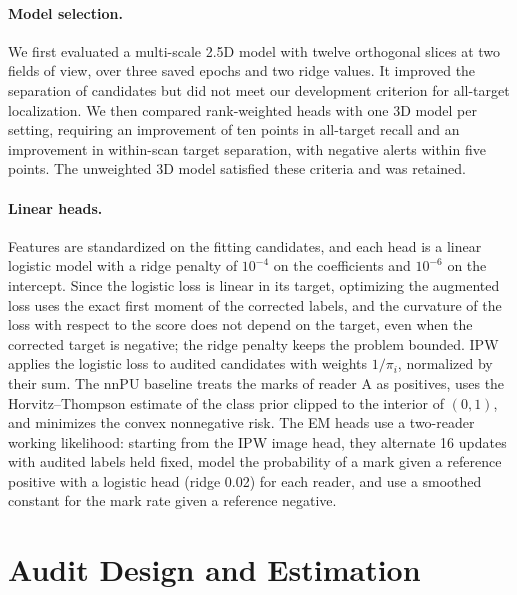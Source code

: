 \paragraph{Model selection.}
We first evaluated a multi-scale 2.5D model with twelve orthogonal slices at two fields of view, over three saved epochs and two ridge values. It improved the separation of candidates but did not meet our development criterion for all-target localization. We then compared rank-weighted heads with one 3D model per setting, requiring an improvement of ten points in all-target recall and an improvement in within-scan target separation, with negative alerts within five points. The unweighted 3D model satisfied these criteria and was retained.

\paragraph{Linear heads.}
Features are standardized on the fitting candidates, and each head is a linear logistic model with a ridge penalty of $10^{-4}$ on the coefficients and $10^{-6}$ on the intercept. Since the logistic loss is linear in its target, optimizing the augmented loss uses the exact first moment of the corrected labels, and the curvature of the loss with respect to the score does not depend on the target, even when the corrected target is negative; the ridge penalty keeps the problem bounded. IPW applies the logistic loss to audited candidates with weights $1/\pi_i$, normalized by their sum. The nnPU baseline treats the marks of reader A as positives, uses the Horvitz--Thompson estimate of the class prior clipped to the interior of $(0,1)$, and minimizes the convex nonnegative risk. The EM heads use a two-reader working likelihood: starting from the IPW image head, they alternate 16 updates with audited labels held fixed, model the probability of a mark given a reference positive with a logistic head (ridge 0.02) for each reader, and use a smoothed constant for the mark rate given a reference negative.

\section{Audit Design and Estimation}
\label{sec:s-audit}

